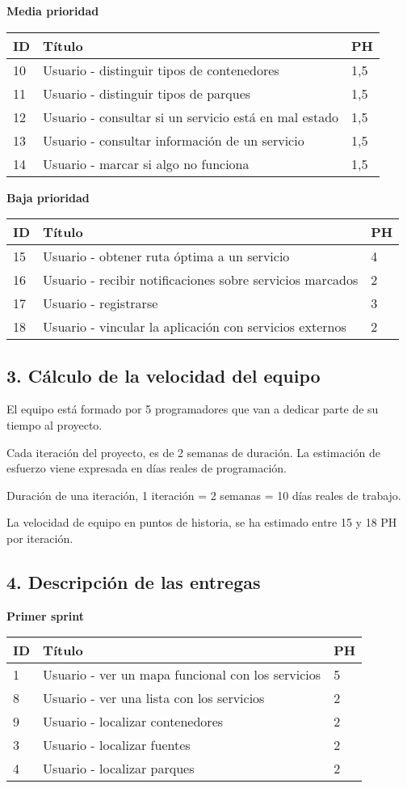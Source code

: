 \documentclass[]{article}
\begin{document}
\textbf{Media prioridad}

\begin{longtable}[]{@{}lll@{}}
\toprule
ID & Título & PH\tabularnewline
\midrule
\endhead
10 & Usuario - distinguir tipos de contenedores & 1,5\tabularnewline
11 & Usuario - distinguir tipos de parques & 1,5\tabularnewline
12 & Usuario - consultar si un servicio está en mal estado &
1,5\tabularnewline
13 & Usuario - consultar información de un servicio & 1,5\tabularnewline
14 & Usuario - marcar si algo no funciona & 1,5\tabularnewline
\bottomrule
\end{longtable}

\textbf{Baja prioridad}

\begin{longtable}[]{@{}lll@{}}
\toprule
ID & Título & PH\tabularnewline
\midrule
\endhead
15 & Usuario - obtener ruta óptima a un servicio & 4\tabularnewline
16 & Usuario - recibir notificaciones sobre servicios marcados &
2\tabularnewline
17 & Usuario - registrarse & 3\tabularnewline
18 & Usuario - vincular la aplicación con servicios externos &
2\tabularnewline
\bottomrule
\end{longtable}

\subsection{3. Cálculo de la velocidad del
equipo}\label{cuxe1lculo-de-la-velocidad-del-equipo}

El equipo está formado por 5 programadores que van a dedicar parte de su
tiempo al proyecto.

Cada iteración del proyecto, es de 2 semanas de duración. La estimación
de esfuerzo viene expresada en días reales de programación.

Duración de una iteración, 1 iteración = 2 semanas = 10 días reales de
trabajo.

La velocidad de equipo en puntos de historia, se ha estimado entre 15 y
18 PH por iteración.

\subsection{4. Descripción de las
entregas}\label{descripciuxf3n-de-las-entregas}

\textbf{Primer sprint}

\begin{longtable}[]{@{}lll@{}}
\toprule
ID & Título & PH\tabularnewline
\midrule
\endhead
1 & Usuario - ver un mapa funcional con los servicios & 5\tabularnewline
8 & Usuario - ver una lista con los servicios & 2\tabularnewline
9 & Usuario - localizar contenedores & 2\tabularnewline
3 & Usuario - localizar fuentes & 2\tabularnewline
4 & Usuario - localizar parques & 2\tabularnewline
\bottomrule
\end{longtable}
\end{document}
